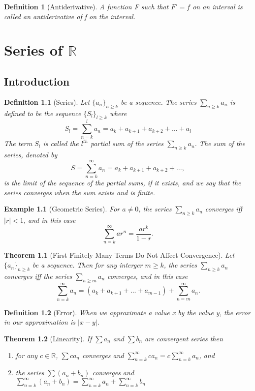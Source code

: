 \documentclass[11pt, oneside]{book}
\theoremstyle{break}
\newtheorem{thm}{Theorem}[section]
\newtheorem{defn}{Definition}[section]
\newtheorem{eg}{Example}[section]
\newcommand{\bb}[1]{\mathbb{#1}}			%
\begin{document}
\begin{defn}[Antiderivative]
	A function F such that $F' = f$ on an interval is called an antiderivative of f on the interval.
\end{defn}


\chapter{Series of \texorpdfstring{$\bb{R}$}{R}}


\section{Introduction}

\begin{defn}[Series]
	Let $\{a_n\}_{n \geq k}$ be a sequence. The series $\sum_{n \geq k} a_n$ is defined to be the sequence $\{S_l\}_{l \geq k}$ where
	\[
		S_l = \sum_{n = k}^{l} a_n = a_k + a_{k + 1} + a_{k + 2} + \hdots + a_l
	\]
	The term $S_l$ is called the $l^{th}$ partial sum of the series $\sum_{n \geq k} a_n$. The sum of the series, denoted by
	\[
		S = \sum_{n = k}^{\infty} a_n = a_k + a_{k + 1} + a_{k + 2} + \hdots ,
	\]
	is the limit of the sequence of the partial sums, if it exists, and we say that the series converges when the sum exists and is finite.
\end{defn}

\begin{eg}[Geometric Series]
	For $a \neq 0$, the series $\sum_{n \geq k} a_n$ converges iff $|r| < 1$, and in this case
	\[
		\sum_{n = k}^{\infty} ar^n = \frac{ar^k}{1 - r}.
	\]
\end{eg}

\begin{thm}[First Finitely Many Terms Do Not Affect Convergence]
	Let $\{a_n\}_{n \geq k}$ be a sequence. Then for any interger $m \geq k$, the series $\sum_{n \geq k} a_n$ converges iff the series $\sum_{n \geq m} a_n$ converges, and in this case
	\[
		\sum_{n = k}^{\infty} a_n = (a_k + a_{k + 1} + \hdots + a_{m - 1}) + \sum_{n = m}^{\infty} a_n.
	\]
\end{thm}

\begin{defn}[Error]
	When we approximate a value x by the value y, the error in our approximation is $|x - y|$.
\end{defn}

\begin{thm}[Linearity]\label{series_linearity}
	If $\sum a_n$ and $\sum b_n$ are convergent series then
	\begin{enumerate}
		\item for any $c \in \bb{R}$, $\sum ca_n$ converges and $\sum\limits_{n=k}^{\infty} ca_n = c \sum\limits_{n=k}^{\infty} a_n$, and
		\item the series $\sum (a_n + b_n)$ converges and $\sum\limits_{n=k}^{\infty} (a_n + b_n) = \sum\limits_{n=k}^{\infty} a_n + \sum\limits_{n=k}^{\infty} b_n$
	\end{enumerate}
\end{thm}
\end{document}
